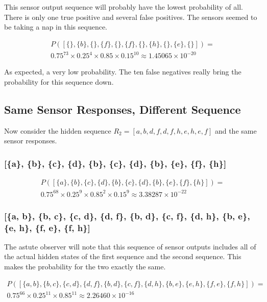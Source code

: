 \documentclass{article}
\begin{document}
This sensor output sequence will probably have the lowest probability of all. 
There is only one true positive and several false positives. The sensors seemed to 
be taking a nap in this sequence.

$$
\begin{gathered}
P([\{\}, \{b\}, \{\}, \{f\}, \{\}, \{f\}, \{\}, \{h\}, \{\}, \{e\}, \{\}]) = \\
0.75^{73} \times 0.25^{4} \times 0.85 \times 0.15^{10} \approx 1.45065 \times 10^{-20}
\end{gathered}
$$

As expected, a very low probability. The ten false negatives really bring the 
probability for this sequence down.

\subsection{Same Sensor Responses, Different Sequence}

Now consider the hidden sequence $R_2 = [a, b, d, f, d, f, h, e, h, e, f]$ and 
the same sensor responses.

\subsubsection{[\{a\}, \{b\}, \{c\}, \{d\}, \{b\}, \{c\}, \{d\}, \{b\}, \{e\}, \{f\}, \{h\}]}

$$
\begin{gathered}
P([\{a\}, \{b\}, \{c\}, \{d\}, \{b\}, \{c\}, \{d\}, \{b\}, \{e\}, \{f\}, \{h\}]) = \\
0.75^{68} \times 0.25^{9} \times 0.85^{2} \times 0.15^{9} \approx 3.38287 \times 10^{-22}
\end{gathered}
$$

\subsubsection{[\{a, b\}, \{b, c\}, \{c, d\}, \{d, f\}, \{b, d\}, \{c, f\}, \{d, h\}, \{b, e\}, \{e, h\}, \{f, e\}, \{f, h\}]}

The astute observer will note that this sequence of sensor outputs includes all 
of the actual hidden states of the first sequence and the second sequence. This 
makes the probability for the two exactly the same. 

$$
\begin{gathered}
P([\{a, b\}, \{b, c\}, \{c, d\}, \{d, f\}, \{b, d\}, \{c, f\}, \{d, h\}, \{b, e\}, \{e, h\}, \{f, e\}, \{f, h\}]) = \\
0.75^{66} \times 0.25^{11} \times 0.85^{11} \approx 2.26460 \times 10^{-16}
\end{gathered}
$$
\end{document}
